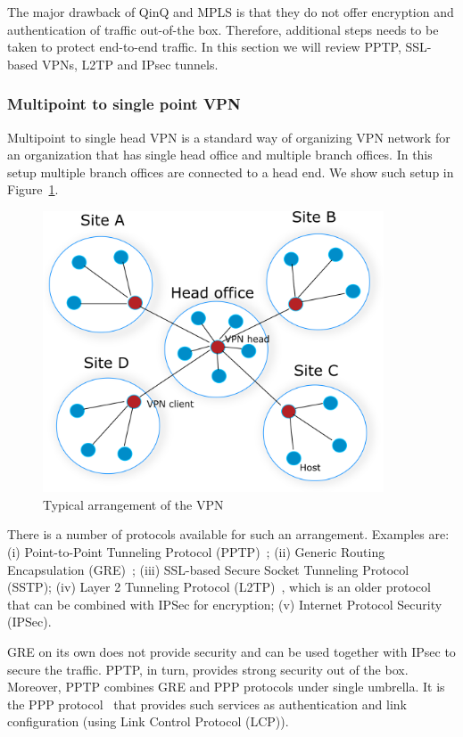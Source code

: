 The major drawback of QinQ and MPLS is that they do not offer encryption and 
authentication of traffic out-of-the box. Therefore, additional steps needs to be taken to protect end-to-end
traffic. In this section we will review PPTP, SSL-based VPNs, L2TP and IPsec tunnels.

\subsubsection{Multipoint to single point VPN}

Multipoint to single head VPN is a standard way of organizing VPN network
for an organization that has single head office and multiple branch offices.
In this setup multiple branch offices are connected to a head end. 
We show such setup in Figure~\ref{fig:head-vpn}.

\begin{figure}[ht!]
    \centering
    \includegraphics[width=0.9\textwidth]{graphics/vpn-central.png}
    \caption{Typical arrangement of the VPN}
    \label{fig:head-vpn}
\end{figure}

There is a number of protocols available for such an arrangement. Examples are:
(i) Point-to-Point Tunneling Protocol (PPTP)~\cite{tcpip}; (ii) Generic Routing Encapsulation (GRE)~\cite{tcpip}; 
(iii) SSL-based Secure Socket Tunneling Protocol (SSTP); (iv) Layer 2 Tunneling Protocol (L2TP)~\cite{tcpip}, 
which is an older protocol that can be combined with IPSec for encryption;
(v) Internet Protocol Security (IPSec).

GRE on its own does not provide security and can be used together with IPsec to secure 
the traffic. PPTP, in turn, provides strong security out of the box. Moreover, PPTP combines 
GRE and PPP protocols under single umbrella. It is the PPP protocol~\cite{tcpip}
that provides such services as authentication and link configuration (\ie using Link Control Protocol (LCP)).

